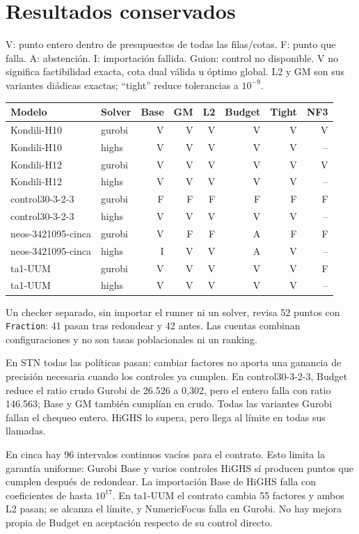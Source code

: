 \documentclass[11pt]{article}
\begin{document}
\section{Resultados conservados}
V: punto entero dentro de presupuestos de todas las filas/cotas. F: punto que falla.
A: abstención. I: importación fallida. Guion: control no disponible.
V no significa factibilidad exacta, cota dual válida u óptimo global. L2 y GM son
sus variantes diádicas exactas; ``tight'' reduce tolerancias a $10^{-9}$.
\begin{center}\small\setlength{\tabcolsep}{4pt}
\begin{tabular}{llrrrrrr}\toprule
Modelo & Solver & Base & GM & L2 & Budget & Tight & NF3\\\midrule
Kondili{-}H10 & gurobi & V & V & V & V & V & V\\
Kondili{-}H10 & highs & V & V & V & V & V & --\\
Kondili{-}H12 & gurobi & V & V & V & V & V & V\\
Kondili{-}H12 & highs & V & V & V & V & V & --\\
control30{-}3{-}2{-}3 & gurobi & F & F & F & F & F & F\\
control30{-}3{-}2{-}3 & highs & V & V & V & V & V & --\\
neos{-}3421095{-}cinca & gurobi & V & F & F & A & F & F\\
neos{-}3421095{-}cinca & highs & I & V & V & A & V & --\\
ta1{-}UUM & gurobi & V & V & V & V & V & F\\
ta1{-}UUM & highs & V & V & V & V & V & --\\
\bottomrule\end{tabular}\end{center}

Un checker separado, sin importar el runner ni un solver, revisa 52 puntos con
\texttt{Fraction}: 41 pasan tras redondear y 42 antes. Las cuentas combinan
configuraciones y no son tasas poblacionales ni un ranking.

En STN todas las políticas pasan: cambiar factores no aporta una ganancia de
precisión necesaria cuando los controles ya cumplen. En control30-3-2-3,
Budget reduce el ratio crudo Gurobi de 26.526 a 0,302, pero el entero falla con
ratio 146.563; Base y GM también cumplían en crudo. Todas las variantes Gurobi
fallan el chequeo entero. HiGHS lo supera, pero llega al límite en todas sus llamadas.

En cinca hay 96 intervalos continuos vacíos para el contrato. Esto limita la
garantía uniforme: Gurobi Base y varios controles HiGHS sí producen puntos que
cumplen después de redondear. La importación Base de HiGHS falla con coeficientes
de hasta $10^{17}$. En ta1-UUM el contrato cambia 55 factores y ambos L2 pasan;
se alcanza el límite, y NumericFocus falla en Gurobi. No hay mejora propia de
Budget en aceptación respecto de su control directo.
\end{document}
